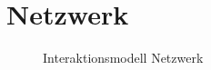 \section{Netzwerk}

\begin{figure}[hp]
  \begin{center}
    {}
  \end{center}
  \caption{Interaktionsmodell Netzwerk}
\end{figure}


